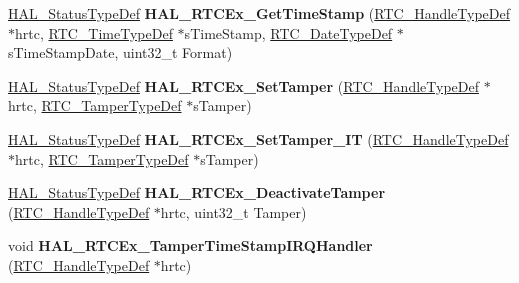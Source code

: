 \begin{DoxyCompactItemize}
\hyperlink{stm32f4xx__hal__def_8h_a63c0679d1cb8b8c684fbb0632743478f}{H\+A\+L\+\_\+\+Status\+Type\+Def} {\bfseries H\+A\+L\+\_\+\+R\+T\+C\+Ex\+\_\+\+Get\+Time\+Stamp} (\hyperlink{struct_r_t_c___handle_type_def}{R\+T\+C\+\_\+\+Handle\+Type\+Def} $\ast$hrtc, \hyperlink{struct_r_t_c___time_type_def}{R\+T\+C\+\_\+\+Time\+Type\+Def} $\ast$s\+Time\+Stamp, \hyperlink{struct_r_t_c___date_type_def}{R\+T\+C\+\_\+\+Date\+Type\+Def} $\ast$s\+Time\+Stamp\+Date, uint32\+\_\+t Format)
\item 
\mbox{\label{group___r_t_c_ex___exported___functions___group1_ga4b819431e03c521285cf3e275d930707}} 
\hyperlink{stm32f4xx__hal__def_8h_a63c0679d1cb8b8c684fbb0632743478f}{H\+A\+L\+\_\+\+Status\+Type\+Def} {\bfseries H\+A\+L\+\_\+\+R\+T\+C\+Ex\+\_\+\+Set\+Tamper} (\hyperlink{struct_r_t_c___handle_type_def}{R\+T\+C\+\_\+\+Handle\+Type\+Def} $\ast$hrtc, \hyperlink{struct_r_t_c___tamper_type_def}{R\+T\+C\+\_\+\+Tamper\+Type\+Def} $\ast$s\+Tamper)
\item 
\mbox{\label{group___r_t_c_ex___exported___functions___group1_ga4984cf38a5bbdf1f607cc94cfdf3797f}} 
\hyperlink{stm32f4xx__hal__def_8h_a63c0679d1cb8b8c684fbb0632743478f}{H\+A\+L\+\_\+\+Status\+Type\+Def} {\bfseries H\+A\+L\+\_\+\+R\+T\+C\+Ex\+\_\+\+Set\+Tamper\+\_\+\+IT} (\hyperlink{struct_r_t_c___handle_type_def}{R\+T\+C\+\_\+\+Handle\+Type\+Def} $\ast$hrtc, \hyperlink{struct_r_t_c___tamper_type_def}{R\+T\+C\+\_\+\+Tamper\+Type\+Def} $\ast$s\+Tamper)
\item 
\mbox{\label{group___r_t_c_ex___exported___functions___group1_gaf0c1b98177dbd9d20c460d6130dbad7e}} 
\hyperlink{stm32f4xx__hal__def_8h_a63c0679d1cb8b8c684fbb0632743478f}{H\+A\+L\+\_\+\+Status\+Type\+Def} {\bfseries H\+A\+L\+\_\+\+R\+T\+C\+Ex\+\_\+\+Deactivate\+Tamper} (\hyperlink{struct_r_t_c___handle_type_def}{R\+T\+C\+\_\+\+Handle\+Type\+Def} $\ast$hrtc, uint32\+\_\+t Tamper)
\item 
\mbox{\label{group___r_t_c_ex___exported___functions___group1_ga710f2cd8bab31242d496b020c182fef3}} 
void {\bfseries H\+A\+L\+\_\+\+R\+T\+C\+Ex\+\_\+\+Tamper\+Time\+Stamp\+I\+R\+Q\+Handler} (\hyperlink{struct_r_t_c___handle_type_def}{R\+T\+C\+\_\+\+Handle\+Type\+Def} $\ast$hrtc)

\end{DoxyCompactItemize}
